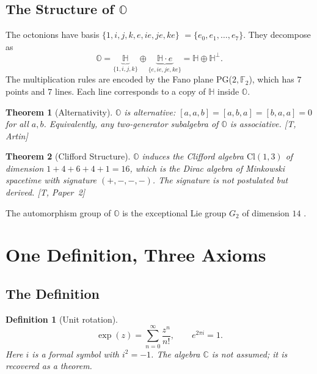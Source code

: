\documentclass[11pt, a4paper]{article}
\newtheorem{theorem}{Theorem}
\newtheorem{definition}{Definition}
\newcommand{\C}{\mathbb{C}}
\newcommand{\Hq}{\mathbb{H}}
\newcommand{\Oct}{\mathbb{O}}
\begin{document}
\subsection{The Structure of $\Oct$}

The octonions have basis $\{1, i, j, k, e, ie, je, ke\}$
$= \{e_0, e_1, \ldots, e_7\}$. They decompose as
\begin{equation}
\Oct = \underbrace{\Hq}_{\{1,i,j,k\}} \oplus \underbrace{\Hq \cdot e}_{\{e, ie, je, ke\}}
= \Hq \oplus \Hq^\perp.
\end{equation}
The multiplication rules are encoded by the Fano plane
PG($2, \mathbb{F}_2$), which has $7$ points and $7$ lines. Each line
corresponds to a copy of $\Hq$ inside $\Oct$.

\begin{theorem}[Alternativity]
\label{thm:alternative}
$\Oct$ is alternative: $[a, a, b] = [a, b, a] = [b, a, a] = 0$
for all $a, b$. Equivalently, any two-generator subalgebra of $\Oct$
is associative. [T, Artin]
\end{theorem}

\begin{theorem}[Clifford Structure]
\label{thm:clifford}
$\Oct$ induces the Clifford algebra $\mathrm{Cl}(1,3)$ of dimension
$1+4+6+4+1 = 16$, which is the Dirac algebra of Minkowski
spacetime with signature $(+,-,-,-)$. The signature is not
postulated but derived. [T, Paper~2]
\end{theorem}

The automorphism group of $\Oct$ is the exceptional Lie group
$G_2$ of dimension $14$ \citep{Cartan1914}.


\section{One Definition, Three Axioms}
\label{sec:axioms}

\subsection{The Definition}

\begin{definition}[Unit rotation]
\label{def:unit}
\begin{equation}
\boxed{\;\exp(z) = \sum_{n=0}^{\infty} \frac{z^n}{n!}, \qquad
e^{2\pi i} = 1.\;}
\label{eq:euler}
\end{equation}
Here $i$ is a formal symbol with $i^2 = -1$. The algebra $\C$ is not
assumed; it is recovered as a theorem.
\end{definition}
\end{document}
